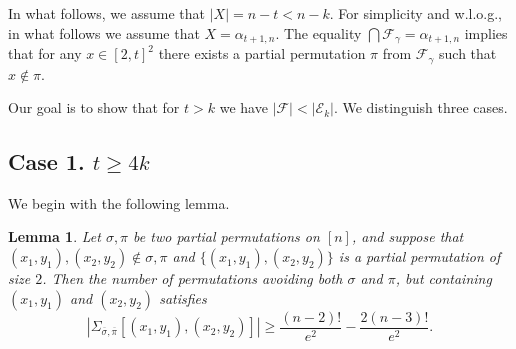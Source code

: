 \documentclass[11pt]{extarticle}
\numberwithin{equation}{section} %
\theoremstyle{plain}
\newtheorem{lem}[thm]{Lemma}
\theoremstyle{definition}
\newcommand{\FF}{\mathcal{F}}
\newcommand{\m}{\mathcal}
\begin{document}
In what follows, we assume that $|X|= n - t < n - k$. For simplicity and w.l.o.g., in what follows we assume that $X = \alpha_{t+1, n}$. The equality $\bigcap \FF_\gamma = \alpha_{t+1, n}$ implies that for any $x \in [2,t]^2$ there exists a partial permutation $\pi$ from $\FF_\gamma$ such that $x \notin \pi$.



  
    
Our goal is to show that for $t>k$ we have $|\FF| < |\m{E}_k|$.  We distinguish three cases.



    \subsection{\textbf{Case 1.} $t \geq 4k$}
    We begin with the following lemma.
\begin{lem} \label{doubleder}
    Let $\sigma, \pi$ be two  
    partial permutations on $[n]$, and suppose that 
    $(x_1, y_1), (x_2, y_2) \notin \sigma, \pi$ and $\{(x_1,y_1),(x_2,y_2)\}$ is a partial permutation of size $2$. 
    Then the number of permutations avoiding both $\sigma$ and $\pi$, but containing $(x_1,y_1)$ and $(x_2,y_2)$ satisfies
    $$|\Sigma_{\overline{\sigma}, \overline{\pi}}[(x_1, y_1), (x_2, y_2)]| \geq \frac{(n-2)!}{e^2} - \frac{2(n-3)!}{e^2}.$$ %
\end{lem}
\end{document}
